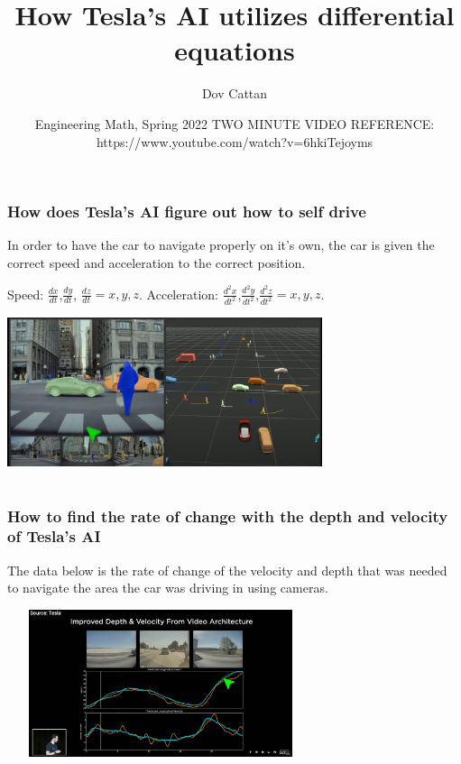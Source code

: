 \documentclass{beamer}
\title[MAP 3305] %
{How Tesla's AI utilizes differential equations}
\author[Cattan, Dov] %
{Dov Cattan}
\institute[FAU] %
{
  
  Student, Computer Engineering\\
  Florida Atlantic University
  
}
\date[ 2022] 
{
 Engineering Math, Spring 2022
\newline \newline  TWO MINUTE VIDEO REFERENCE: https://www.youtube.com/watch?v=6hkiTejoyms
}
\begin{document}
\frame{\titlepage}

\section{}


\begin{frame}
\frametitle{How does Tesla's AI figure out how to self drive}
In order to have the car to navigate properly on it's own, the car is given the correct speed and acceleration to the correct position. \newline


   
    Speed: $\frac{dx}{dt}$,$\frac{dy}{dt}$, $\frac{dz}{dt} = x, y, z$.         
    Acceleration: $\frac{d^2x}{dt^2}$,$\frac{d^2y}{dt^2}$,$\frac{d^2z}{dt^2} = x, y, z$.
   \newline
   


\includegraphics[height = 4.35cm, width= \textwidth]{tesla 1.PNG}

\end{frame}



\section{}
\begin{frame}
\frametitle{How to find the rate of change with the depth and velocity of Tesla's AI}

The data below is the rate of change of the velocity and depth that was needed to navigate the area the car was driving in using cameras.
\newline

\includegraphics[height=4.32cm,width = 9cm]{tesla 2.PNG}\centering




\end{frame}
\end{document}
